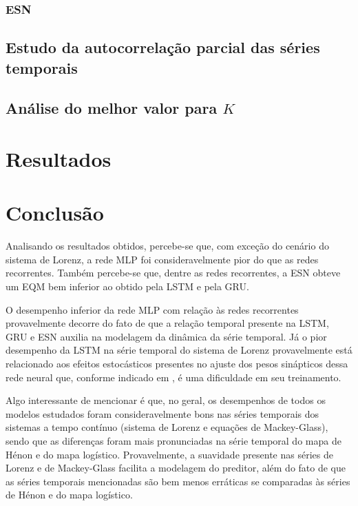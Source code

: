\documentclass[a4paper, 12pt]{article}
\begin{document}
\subsubsection{ESN}

\subsection{Estudo da autocorrelação parcial das séries temporais}

\subsection{Análise do melhor valor para $K$}

\section{Resultados}

\section{Conclusão}

Analisando os resultados obtidos, percebe-se que, com exceção do cenário do sistema de Lorenz, a rede MLP foi consideravelmente pior do que as redes recorrentes. Também percebe-se que, dentre as redes recorrentes, a ESN obteve um EQM bem inferior ao obtido pela LSTM e pela GRU.

O desempenho inferior da rede MLP com relação às redes recorrentes provavelmente decorre do fato de que a relação temporal presente na LSTM, GRU e ESN auxilia na modelagem da dinâmica da série temporal. Já o pior desempenho da LSTM na série temporal do sistema de Lorenz provavelmente está relacionado aos efeitos estocásticos presentes no ajuste dos pesos sinápticos dessa rede neural que, conforme indicado em \cite{doya1992bifurcations}, é uma dificuldade em seu treinamento.

Algo interessante de mencionar é que, no geral, os desempenhos de todos os modelos estudados foram consideravelmente bons nas séries temporais dos sistemas a tempo contínuo (sistema de Lorenz e equações de Mackey-Glass), sendo que as diferenças foram mais pronunciadas na série temporal do mapa de Hénon e do mapa logístico. Provavelmente, a suavidade presente nas séries de Lorenz e de Mackey-Glass facilita a modelagem do preditor, além do fato de que as séries temporais mencionadas são bem menos erráticas se comparadas às séries de Hénon e do mapa logístico.
\end{document}
